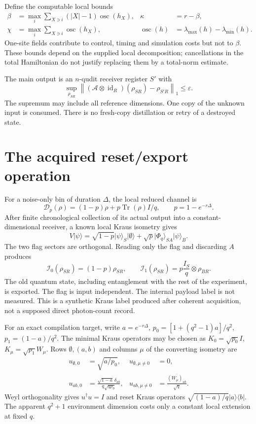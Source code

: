 \documentclass[11pt,a4paper]{article}
\newcommand{\id}{\operatorname{id}}\newcommand{\Tr}{\operatorname{Tr}}\newcommand{\osc}{\operatorname{osc}}
\newcommand{\norm}[1]{\left\lVert #1\right\rVert}\newcommand{\ket}[1]{\lvert #1\rangle}\newcommand{\bra}[1]{\langle #1\rvert}
\begin{document}
Define the computable local bounds
\begin{align}
\beta&=\max_i\sum_{X\ni i}(|X|-1)\osc(h_X), &\kappa&=r-\beta,\\
\chi&=\max_i\sum_{X\ni i}\osc(h_X), &\osc(h)&=\lambda_{\max}(h)-\lambda_{\min}(h).
\end{align}
One-site fields contribute to control, timing and simulation costs but not to $\beta$. These bounds depend on the supplied local decomposition; cancellations in the total Hamiltonian do not justify replacing them by a total-norm estimate.

The main output is an $n$-qudit receiver register $S'$ with
\begin{equation}
\sup_{\rho_{SR}}\norm{(\mathcal A\otimes\id_R)(\rho_{SR})-\rho_{S'R}}_1\le\varepsilon.
\end{equation}
The supremum may include all reference dimensions. One copy of the unknown input is consumed. There is no fresh-copy distillation or retry of a destroyed state.

\section{The acquired reset/export operation}

For a noise-only bin of duration $\Delta$, the local reduced channel is
\begin{equation}
\mathcal D_p(\rho)=(1-p)\rho+p\Tr(\rho)I/q,\qquad p=1-e^{-r\Delta}.
\end{equation}
After finite chronological collection of its actual output into a constant-dimensional receiver, a known local Kraus isometry gives
\begin{equation}
V\ket\psi=
\sqrt{1-p}\ket\psi_S\ket{\emptyset}
+\sqrt p\ket{\Phi_q}_{SA}\ket\psi_B.
\label{eq:exportisometry}
\end{equation}
The two flag sectors are orthogonal. Reading only the flag and discarding $A$ produces
\begin{equation}
\mathcal I_0(\rho_{SR})=(1-p)\rho_{SR},\qquad
\mathcal I_1(\rho_{SR})=p\frac{I_S}{q}\otimes\rho_{BR}.
\label{eq:instrument}
\end{equation}
The old quantum state, including entanglement with the rest of the experiment, is exported. The flag is input independent. The internal payload label is not measured. This is a synthetic Kraus label produced after coherent acquisition, not a supposed direct photon-count record.

For an exact compilation target, write $a=e^{-r\Delta}$, $p_0=[1+(q^2-1)a]/q^2$, $p_1=(1-a)/q^2$. The minimal Kraus operators may be chosen as $K_0=\sqrt{p_0}I$, $K_\mu=\sqrt{p_1}W_\mu$. Rows $\emptyset,(a,b)$ and columns $\mu$ of the converting isometry are
\begin{align}
u_{\emptyset,0}&=\sqrt{a/p_0},&u_{\emptyset,\mu\ne0}&=0,\\
u_{ab,0}&=\frac{\sqrt{1-a}\,\delta_{ab}}{q\sqrt{qp_0}},&
u_{ab,\mu\ne0}&=\frac{\overline{(W_\mu)_{ab}}}{\sqrt q}.
\end{align}
Weyl orthogonality gives $u^\dagger u=I$ and reset Kraus operators $\sqrt{(1-a)/q}\ket a\bra b$. The apparent $q^2+1$ environment dimension costs only a constant local extension at fixed $q$.
\end{document}
